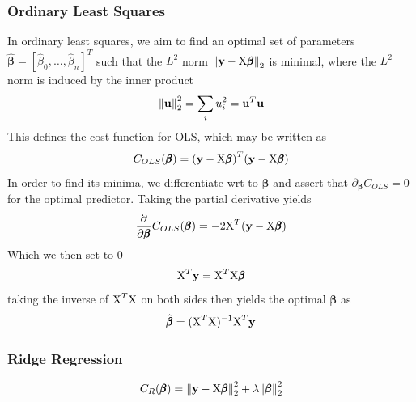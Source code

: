 \documentclass[reprint, english, nofootinbib]{revtex4-2}
\begin{document}
        \subsubsection{Ordinary Least Squares}
            \noindent
            In ordinary least squares, we aim to find an optimal set of parameters $\pmb{\hat\beta} = [\hat\beta_0, \dots, \hat\beta_n]^T$ such that the $L^2$ norm $\norm{\mathbf y - \textup{X}\pmb{\beta}}_2$ is minimal, where the $L^2$ norm is induced by the inner product
            \begin{equation}
                \norm{\mathbf u}_2^2 = \sum_i u_i^2 = \mathbf u^T \mathbf u
            \end{equation}
            This defines the cost function for OLS, which may be written as
            \begin{equation}
                C_{OLS}(\pmb \beta)
                = \qty(\mathbf y - \textup{X}\pmb \beta)^T(\mathbf y - \textup{X}\pmb \beta)
            \end{equation}
            In order to find its minima, we differentiate wrt to $\pmb\beta$ and assert that $\partial_{\pmb\beta}C_{OLS} = 0$ for the optimal predictor. Taking the partial derivative yields
            \begin{align}
                \begin{split}
                \pdv{\pmb\beta}C_{OLS}(\pmb\beta) = -2\textup{X}^T\qty(\mathbf y - \textup X\pmb \beta)
                \end{split}
            \end{align}
            Which we then set to $0$
            \begin{equation}
                \textup{X}^T\mathbf y = \textup{X}^T\textup{X}\pmb\beta
            \end{equation}
            taking the inverse of $\textup{X}^T\textup{X}$ on both sides then yields the optimal $\pmb\beta$ as
            \begin{equation}
                \hat{\pmb \beta} = (\textup{X}^T\textup{X})^{-1}\textup{X}^T\mathbf y
            \end{equation}
        \subsubsection{Ridge Regression}
            \begin{equation}
                C_{R}(\pmb \beta)
                = \norm{\mathbf y - \textup{X}\pmb{\beta}}_2^2
                + \lambda \norm{\pmb{\beta}}_2^2
            \end{equation}
			
\end{document}
